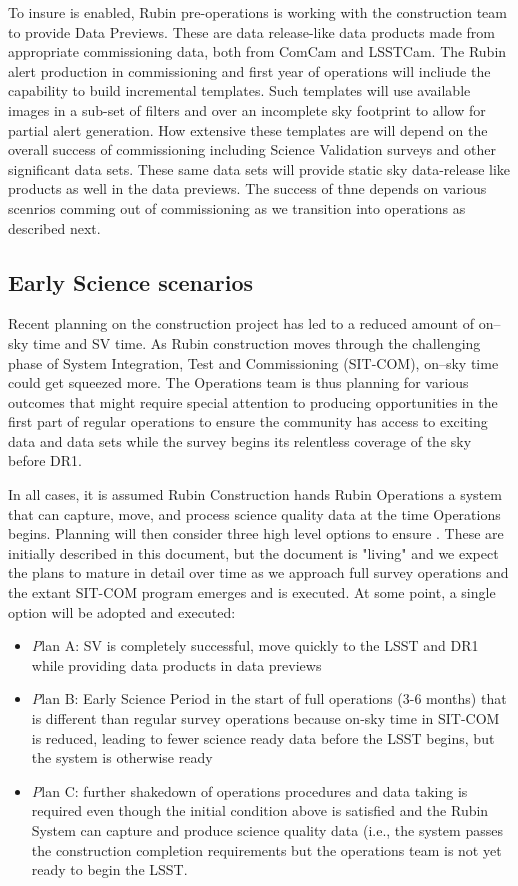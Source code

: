 To insure \es is enabled, Rubin pre-operations is working with the construction team to provide Data Previews. These are data release-like data products made from appropriate commissioning data, both from ComCam and LSSTCam. The Rubin alert production in commissioning and first year of operations will incliude the capability to build incremental templates. Such templates will use available images in a sub-set of filters and over an incomplete sky footprint to allow for partial alert generation. How extensive these templates are will depend on the overall success of commissioning including Science Validation surveys and other significant data sets. These same data sets will provide static sky data-release like products as well in the data previews. The success of \es thne depends on various scenrios comming out of commissioning as we transition into operations as described next.   

\subsection{Early Science scenarios } \label{ssec:scenarios}
Recent planning on the construction project has led to a reduced amount of on--sky time and SV time.
As Rubin construction moves through the challenging phase of System Integration, Test and Commissioning (SIT-COM), on--sky time could get squeezed more. The Operations team is thus planning for various outcomes that might require special attention to producing \es opportunities in the first part of regular operations to ensure the community has access to exciting data and data sets while the survey begins its relentless coverage of the sky before DR1.

In all cases, it is assumed Rubin Construction hands Rubin Operations a system that can capture, move, and process science quality data at the time Operations begins. Planning will then consider three high level options to ensure \es. These are initially described in this document, but the document is "living" and we expect the plans to mature in detail over time as we approach full survey operations and the extant SIT-COM program emerges and is executed. At some point, a single option will be adopted and executed:

\begin{itemize}
\item {\textit Plan A:} SV is completely successful, move quickly to the LSST and DR1 while providing \es data products in data previews
\item {\textit Plan B:} Early Science Period in the start of full operations (3-6 months) that is different than regular survey operations because on-sky time in SIT-COM is reduced, leading to fewer science ready data before the LSST begins, but the system is otherwise ready
\item {\textit Plan C:} further shakedown of operations procedures and data taking is required even though the initial condition above is satisfied and the Rubin System can capture and produce science quality data (i.e., the system passes the construction completion requirements but the operations team is not yet ready to begin the LSST.

\end{itemize}

